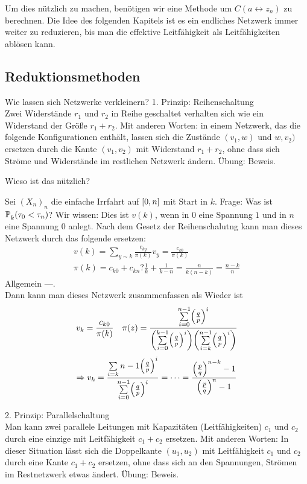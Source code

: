 Um dies nützlich zu machen, benötigen wir eine Methode um $C(a \leftrightarrow z_n)$ zu berechnen. Die Idee des folgenden Kapitels ist es ein endliches Netzwerk immer weiter zu reduzieren, bis man die effektive Leitfähigkeit als Leitfähigkeiten ablösen kann.

\subsection{Reduktionsmethoden}
Wie lassen sich Netzwerke verkleinern?
1. Prinzip: Reihenschaltung \\
Zwei Widerstände $r_1$ und $r_2$ in Reihe geschaltet verhalten sich wie ein Widerstand der Größe $r_1 + r_2$. Mit anderen Worten: in einem Netzwerk, das die folgende Konfigurationen enthält, lassen sich die Zustände $(v_1,w)$ und $w,v_2)$  ersetzen durch die Kante $(v_1,v_2)$  mit Widerstand $r_1+r_2$, ohne dass sich Ströme und Widerstände im restlichen Netzwerk ändern. Übung: Beweis. 

Wieso ist das nützlich?
\begin{beispiel}
	Sei $(X_n)_n$ die einfache Irrfahrt auf $\left\lbrack0,n\right\rbrack$ mit Start in $k$. Frage: Was ist $\prop{\tau_0 < \tau_n}[][k]$? Wir wissen: Dies ist $v(k)$, wenn in $0$ eine Spannung $1$ und in $n$ eine Spannung $0$ anlegt.
	 Nach dem Gesetz der Reihenschalutng kann man dieses Netzwerk durch das folgende ersetzen:
	\begin{align}
		v(k) = \sum\limits_{y \sim k}\frac{c_{ky}}{\pi(k)}v_y = \frac{c_{k0}}{\pi(k)} \\
		\pi(k) = c_{k0} + c_{kn} ? \frac{1}{k} + \frac{1}{k-n} = \frac{n}{k(n-k)} = \frac{n-k}{n}
	\end{align}
	Allgemein ---. \\

	Dann kann man dieses Netzwerk zusammenfassen als 
	Wieder ist 
	\begin{align}
		v_k = \frac{c_{k0}}{\pi(k)} && \pi(z) = \frac{\sum\limits_{i=0}^{n-1}\enb{\frac{q}{p}}^i}{\enb{\sum\limits_{i=0}^{k-1}\enb{\frac{q}{p}}^i} \enb{\sum\limits_{i=k}^{n-1} \enb{\frac{q}{p}}^i}} \\
	\end{align}
	\begin{align}
		\Rightarrow v_k = \frac{\sum\limits_{i=k}{n-1} \enb{\frac{q}{p}}^i}{\sum\limits_{i=0}^{n-1}\enb{\frac{q}{p}}^i} = \dots = \frac{\enb{\frac{p}{q}}^{n-k} -1}{\enb{\frac{p}{q}}^n-1}
 	\end{align}
\end{beispiel}
2. Prinzip: Parallelschaltung \\
Man kann zwei parallele Leitungen mit Kapazitäten (Leitfähigkeiten) $c_1$ und $c_2$ durch eine einzige mit Leitfähigkeit $c_1+c_2$ ersetzen. Mit anderen Worten: In dieser Situation  lässt sich die Doppelkante $(u_1,u_2)$ mit Leitfähigkeit $c_1$ und $c_2$ durch eine Kante $c_1+c_2$ ersetzen, ohne dass sich an den Spannungen, Strömen im Restnetzwerk etwas ändert. Übung: Beweis.

